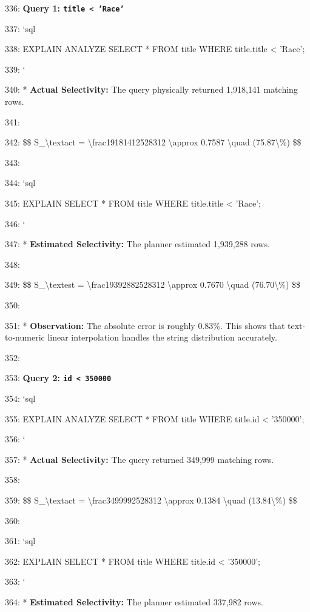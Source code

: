 \documentclass[11pt,a4paper]{article}
\begin{document}
{336: \textbf{Query 1: \texttt{title < 'Race'}}

337: \texttt{}`sql

338: EXPLAIN ANALYZE SELECT * FROM title WHERE title.title < 'Race';

339: \texttt{}`

340: *   \textbf{Actual Selectivity:} The query physically returned 1,918,141 matching rows.

341:

342:     \$\$ S\_{\textbackslash{}text{act}} = \textbackslash{}frac{1918141}{2528312} \textbackslash{}approx 0.7587 \textbackslash{}quad (75.87\textbackslash{}\%) \$\$

343:

344: \texttt{}`sql

345: EXPLAIN SELECT * FROM title WHERE title.title < 'Race';

346: \texttt{}`

347: *   \textbf{Estimated Selectivity:} The planner estimated 1,939,288 rows.

348:

349:     \$\$ S\_{\textbackslash{}text{est}} = \textbackslash{}frac{1939288}{2528312} \textbackslash{}approx 0.7670 \textbackslash{}quad (76.70\textbackslash{}\%) \$\$

350:

351: *   \textbf{Observation:} The absolute error is roughly 0.83\%. This shows that text-to-numeric linear interpolation handles the string distribution accurately.

352:

353: \textbf{Query 2: \texttt{id < 350000}}

354: \texttt{}`sql

355: EXPLAIN ANALYZE SELECT * FROM title WHERE title.id < '350000';

356: \texttt{}`

357: *   \textbf{Actual Selectivity:} The query returned 349,999 matching rows.

358:

359:     \$\$ S\_{\textbackslash{}text{act}} = \textbackslash{}frac{349999}{2528312} \textbackslash{}approx 0.1384 \textbackslash{}quad (13.84\textbackslash{}\%) \$\$

360:

361: \texttt{}`sql

362: EXPLAIN SELECT * FROM title WHERE title.id < '350000';

363: \texttt{}`

364: *   \textbf{Estimated Selectivity:} The planner estimated 337,982 rows.

}
\end{document}
